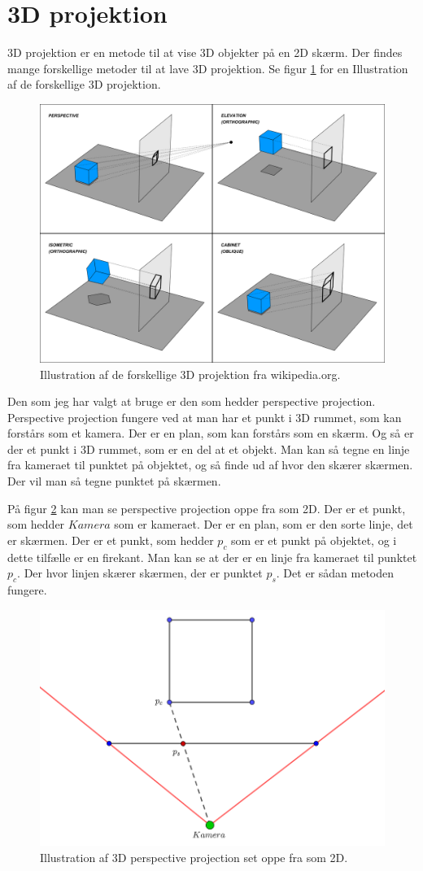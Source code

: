 \documentclass{article}
\begin{document}
\section{3D projektion}
3D projektion er en metode til at vise 3D objekter på en 2D skærm. 
Der findes mange forskellige metoder til at lave 3D projektion.
Se figur \ref{fig:3dpro} for en Illustration af de forskellige 3D projektion.

\begin{figure}[H]
\centering
\includegraphics[width=0.7\linewidth]{3dpro.png}
\caption{\label{fig:3dpro}Illustration af de forskellige 3D projektion fra wikipedia.org.}
\end{figure}

Den som jeg har valgt at bruge er den som hedder perspective projection.
Perspective projection fungere ved at man har et punkt i 3D rummet, som kan forstårs som et kamera.
Der er en plan, som kan forstårs som en skærm.
Og så er der et punkt i 3D rummet, som er en del at et objekt.
Man kan så tegne en linje fra kameraet til punktet på objektet, og så finde ud af hvor den skærer skærmen.
Der vil man så tegne punktet på skærmen.

På figur \ref{fig:plan} kan man se perspective projection oppe fra som 2D.
Der er et punkt, som hedder $Kamera$ som er kameraet. 
Der er en plan, som er den sorte linje, det er skærmen.
Der er et punkt, som hedder $p_{c}$ som er et punkt på objektet, og i dette tilfælle er en firekant.
Man kan se at der er en linje fra kameraet til punktet $p_{c}$.
Der hvor linjen skærer skærmen, der er punktet $p_{s}$.
Det er sådan metoden fungere.

\begin{figure}[H]
\centering
\includegraphics[width=0.7\linewidth]{plan.png}
\caption{\label{fig:plan}Illustration af 3D perspective projection set oppe fra som 2D.}
\end{figure}
\end{document}
